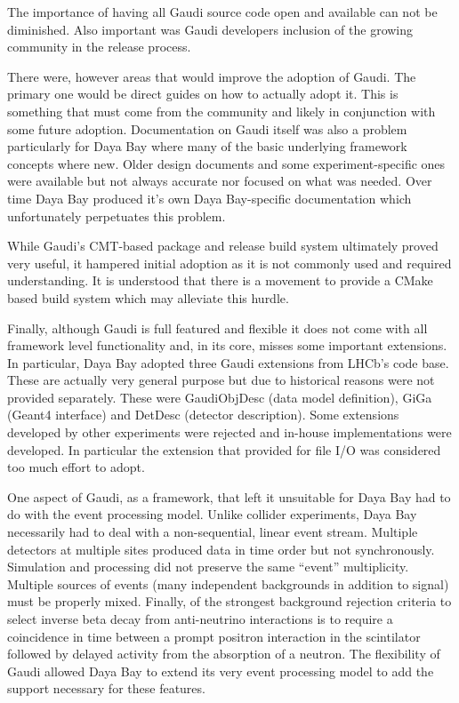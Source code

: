 The importance of having all Gaudi source code open and available can
not be diminished.  Also important was Gaudi developers inclusion of
the growing community in the release process.

There were, however areas that would improve the adoption of Gaudi.
The primary one would be direct guides on how to actually adopt it.
This is something that must come from the community and likely in
conjunction with some future adoption.  Documentation on Gaudi itself
was also a problem particularly for Daya Bay where many of the basic
underlying framework concepts where new.  Older design documents and
some experiment-specific ones were available but not always accurate
nor focused on what was needed.  Over time Daya Bay produced it's own
Daya Bay-specific documentation which unfortunately perpetuates this
problem.

While Gaudi's CMT-based package and release build system ultimately
proved very useful, it hampered initial adoption as it is not commonly
used and required understanding.  It is understood that there is a
movement to provide a CMake based build system which may alleviate
this hurdle.

Finally, although Gaudi is full featured and flexible it does not come
with all framework level functionality and, in its core, misses some
important extensions.  In particular, Daya Bay adopted three Gaudi
extensions from LHCb's code base.  These are actually very general
purpose but due to historical reasons were not provided separately.
These were GaudiObjDesc (data model definition), GiGa (Geant4
interface) and DetDesc (detector description).  Some extensions
developed by other experiments were rejected and in-house
implementations were developed.  In particular the extension that
provided for file I/O was considered too much effort to adopt.   

One aspect of Gaudi, as a framework, that left it unsuitable for Daya
Bay had to do with the event processing model.  Unlike collider
experiments, Daya Bay necessarily had to deal with a non-sequential,
linear event stream.  Multiple detectors at multiple sites produced
data in time order but not synchronously.  Simulation and processing
did not preserve the same ``event'' multiplicity.  Multiple sources of
events (many independent backgrounds in addition to signal) must be
properly mixed.  Finally, of the strongest background rejection
criteria to select inverse beta decay from anti-neutrino interactions
is to require a coincidence in time between a prompt positron
interaction in the scintilator followed by delayed activity from the
absorption of a neutron.  The flexibility of Gaudi allowed Daya Bay to
extend its very event processing model to add the support necessary
for these features.  



